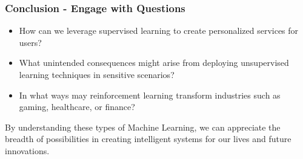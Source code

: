 \documentclass[aspectratio=169]{beamer}
\begin{document}
\begin{frame}[fragile]
    \frametitle{Conclusion - Engage with Questions}
    \begin{itemize}
        \item How can we leverage supervised learning to create personalized services for users?
        \item What unintended consequences might arise from deploying unsupervised learning techniques in sensitive scenarios?
        \item In what ways may reinforcement learning transform industries such as gaming, healthcare, or finance?
    \end{itemize}
    
    By understanding these types of Machine Learning, we can appreciate the breadth of possibilities in creating intelligent systems for our lives and future innovations.
\end{frame}
\end{document}
